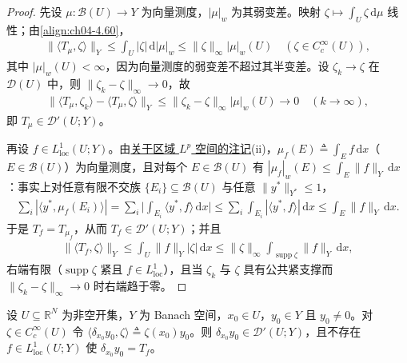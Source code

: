 \documentclass[../../main.tex]{subfiles}%
\begin{document}
\begin{proof}
先设 $\mu:\mathcal{B}(U)\to Y$ 为向量测度，$|\mu|_w$ 为其弱变差。映射 $\zeta\mapsto\int_U\zeta\,\mathrm{d}\mu$ 线性；由\eqref{align:ch04-4.60}，
\begin{align*}
\|\langle T_\mu,\zeta\rangle\|_Y\leqslant\int_U|\zeta|\,\mathrm{d}|\mu|_w\leqslant\|\zeta\|_\infty|\mu|_w(U)\quad(\zeta\in C_c^\infty(U)),
\end{align*}
其中 $|\mu|_w(U)<\infty$，因为向量测度的弱变差不超过其半变差。设 $\zeta_k\to\zeta$ 在 $\mathcal{D}(U)$ 中，则 $\|\zeta_k-\zeta\|_\infty\to0$，故
\begin{align*}
\|\langle T_\mu,\zeta_k\rangle-\langle T_\mu,\zeta\rangle\|_Y\leqslant\|\zeta_k-\zeta\|_\infty|\mu|_w(U)\to0\quad(k\to\infty),
\end{align*}
即 $T_\mu\in\mathcal{D}'(U;Y)$。

再设 $f\in L^1_{\mathrm{loc}}(U;Y)$。由\hyperref[remark:ch04-区域Lp]{关于区域 $L^p$ 空间的注记}(ii)，$\mu_f(E)\triangleq\int_Ef\,\mathrm{d}x$（$E\in\mathcal{B}(U)$）为向量测度，且对每个 $E\in\mathcal{B}(U)$ 有 $|\mu_f|_w(E)\leqslant\int_E\|f\|_Y\,\mathrm{d}x$：事实上对任意有限不交族 $\{E_i\}\subseteq\mathcal{B}(U)$ 与任意 $\|y^*\|_{Y^*}\leqslant1$，
\begin{align*}
\sum_i|\langle y^*,\mu_f(E_i)\rangle|=\sum_i\Big|\int_{E_i}\langle y^*,f\rangle\,\mathrm{d}x\Big|\leqslant\sum_i\int_{E_i}|\langle y^*,f\rangle|\,\mathrm{d}x\leqslant\int_E\|f\|_Y\,\mathrm{d}x .
\end{align*}
于是 $T_f=T_{\mu_f}$，从而 $T_f\in\mathcal{D}'(U;Y)$；并且
\begin{align*}
\|\langle T_f,\zeta\rangle\|_Y\leqslant\int_U\|f\|_Y|\zeta|\,\mathrm{d}x\leqslant\|\zeta\|_\infty\int_{\operatorname{supp}\zeta}\|f\|_Y\,\mathrm{d}x ,
\end{align*}
右端有限（$\operatorname{supp}\zeta$ 紧且 $f\in L^1_{\mathrm{loc}}$），且当 $\zeta_k$ 与 $\zeta$ 具有公共紧支撑而 $\|\zeta_k-\zeta\|_\infty\to0$ 时右端趋于零。
\end{proof}

\begin{example}\label{example:ch04-向量Dirac}
设 $U\subseteq\mathbb{R}^N$ 为非空开集，$Y$ 为 Banach 空间，$x_0\in U$，$y_0\in Y$ 且 $y_0\neq0$。对 $\zeta\in C_c^\infty(U)$ 令 $\langle\delta_{x_0}y_0,\zeta\rangle\triangleq\zeta(x_0)y_0$。则 $\delta_{x_0}y_0\in\mathcal{D}'(U;Y)$，且不存在 $f\in L^1_{\mathrm{loc}}(U;Y)$ 使 $\delta_{x_0}y_0=T_f$。
\end{example}
\end{document}
